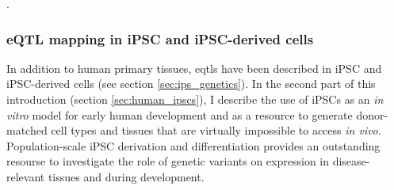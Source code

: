 \cite{mancuso2018large, wainberg2019opportunities}.


\subsubsection{eQTL mapping in iPSC and iPSC-derived cells}

In addition to human primary tissues, \glspl{eqtl} have been described in iPSC and iPSC-derived cells (see section \ref{sec:ips_genetics}).
In the second part of this introduction (section \ref{sec:human_ipscs}), I describe the use of iPSCs as an \textit{in vitro} model for early human development and as a resource to generate donor-matched cell types and tissues that are virtually impossible to access \textit{in vivo}.
Population-scale iPSC derivation and differentiation provides an outstanding resourse to investigate the role of genetic variants on expression in disease-relevant tissues and during development.






